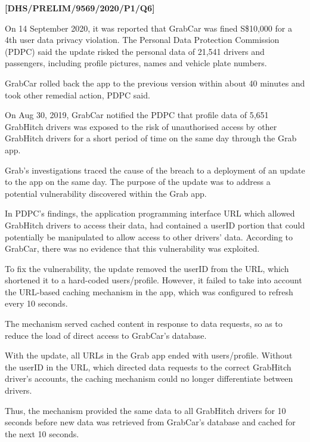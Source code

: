 \item \textbf{{[}DHS/PRELIM/9569/2020/P1/Q6{]} }

On 14 September 2020, it was reported that GrabCar was fined S\$10,000
for a 4th user data privacy violation. The Personal Data Protection
Commission (PDPC) said the update risked the personal data of 21,541
drivers and passengers, including profile pictures, names and vehicle
plate numbers. 

GrabCar rolled back the app to the previous version within about 40
minutes and took other remedial action, PDPC said. 

On Aug 30, 2019, GrabCar notified the PDPC that profile data of 5,651
GrabHitch drivers was exposed to the risk of unauthorised access by
other GrabHitch drivers for a \textquotedbl short period of time
on the same day\textquotedbl{} through the Grab app. 

Grab's investigations traced the cause of the breach to a deployment
of an update to the app on the same day. The purpose of the update
was to address a potential vulnerability discovered within the Grab
app. 

In PDPC's findings, the application programming interface URL which
allowed GrabHitch drivers to access their data, had contained a \textquotedbl userID\textquotedbl{}
portion that could potentially be manipulated to allow access to other
drivers' data. According to GrabCar, there was no evidence that this
vulnerability was exploited. 

To fix the vulnerability, the update removed the \textquotedbl userID\textquotedbl{}
from the URL, which shortened it to a hard-coded \textquotedbl users/profile\textquotedbl .
However, it failed to take into account the URL-based caching mechanism
in the app, which was configured to refresh every 10 seconds. 

The mechanism served cached content in response to data requests,
so as to reduce the load of direct access to GrabCar's database. 

With the update, all URLs in the Grab app ended with \textquotedbl users/profile\textquotedbl .
Without the \textquotedbl userID\textquotedbl{} in the URL, which
directed data requests to the correct GrabHitch driver's accounts,
the caching mechanism could no longer differentiate between drivers. 

Thus, the mechanism provided the same data to all GrabHitch drivers
for 10 seconds before new data was retrieved from GrabCar's database
and cached for the next 10 seconds. 

